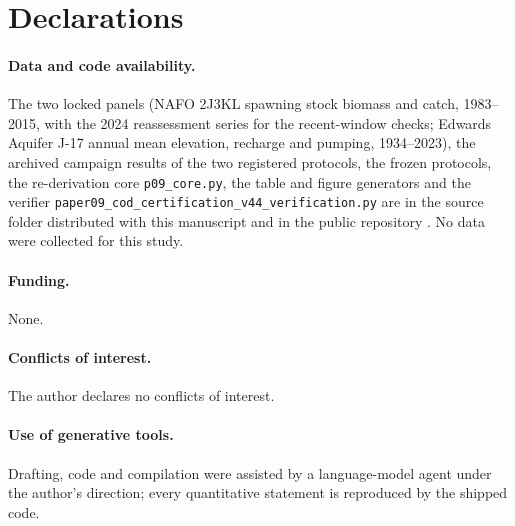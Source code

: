 \section*{Declarations}
\paragraph{Data and code availability.} The two locked panels (NAFO 2J3KL spawning stock biomass and catch, 1983--2015, with the 2024 reassessment series for the recent-window checks; Edwards Aquifer J-17 annual mean elevation, recharge and pumping, 1934--2023), the archived campaign results of the two registered protocols, the frozen protocols, the re-derivation core \texttt{p09\_core.py}, the table and figure generators and the verifier \texttt{paper09\_cod\_certification\_v44\_verification.py} are in the source folder  distributed with this manuscript and in the public repository . No data were collected for this study.
\paragraph{Funding.} None.
\paragraph{Conflicts of interest.} The author declares no conflicts of interest.
\paragraph{Use of generative tools.} Drafting, code and compilation were assisted by a language-model agent under the author's direction; every quantitative statement is reproduced by the shipped code.

